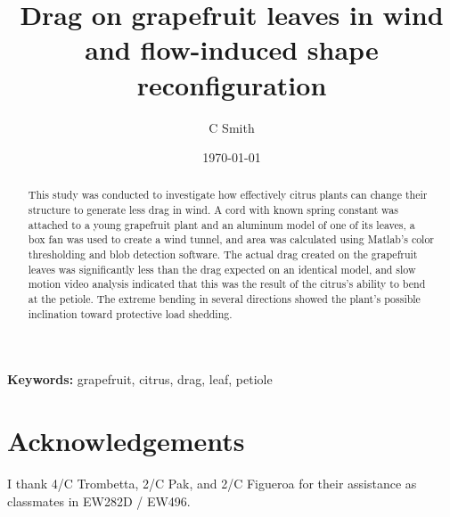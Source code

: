 \documentclass[]{article}
\title{Drag on grapefruit leaves in wind and flow-induced shape reconfiguration}
\author{C Smith}
\date{\today}
\newcommand{\Matlab}{Matlab}
\begin{document}
\lstset{
  basicstyle=\ttfamily}

\maketitle
\begin{abstract}
This study was conducted to investigate how effectively citrus plants can change their structure to generate less drag in wind. A cord with known spring constant was attached to a young grapefruit plant and an aluminum model of one of its leaves, a box fan was used to create a wind tunnel, and area was calculated using \Matlab's color thresholding and blob detection software. The actual drag created on the grapefruit leaves was significantly less than the drag expected on an identical model, and slow motion video analysis indicated that this was the result of the citrus's ability to bend at the petiole. The extreme bending in several directions showed the plant's possible inclination toward protective load shedding.
\end{abstract}
{\scriptsize\textbf{Keywords: }grapefruit, citrus, drag, leaf, petiole}


\section{Acknowledgements}
I thank 4/C Trombetta, 2/C Pak, and 2/C Figueroa for their assistance as classmates in EW282D / EW496. 



%
\end{document}
